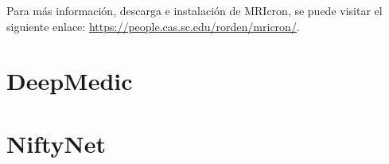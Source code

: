 
Para más información, descarga e instalación de MRIcron, se puede visitar el siguiente enlace: \url{https://people.cas.sc.edu/rorden/mricron/}.


\section{DeepMedic}


\section{NiftyNet}

